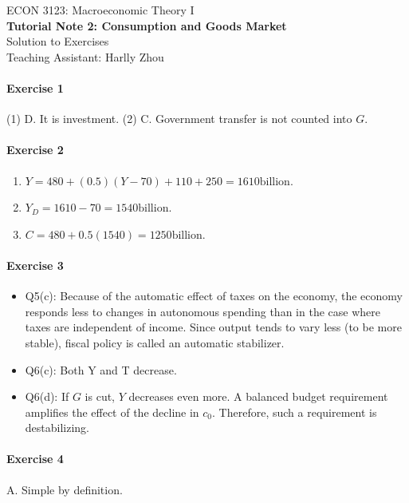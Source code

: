 \documentclass[12pt]{article}
\numberwithin{equation}{section}
\begin{document}
\begin{center}
    ECON 3123: Macroeconomic Theory I\\
    {\large \textbf{Tutorial Note 2: Consumption and Goods Market}}\\
    Solution to Exercises\\
    Teaching Assistant: Harlly Zhou
\end{center}

\paragraph{Exercise 1}
(1) D. It is investment. (2) C. Government transfer is not counted into $G$.

\paragraph{Exercise 2}
\begin{enumerate}[label=\alph*.]
    \item $Y=480+(0.5)(Y-70)+110+250=1610\text{billion}$.
    \item $Y_D = 1610 - 70 = 1540\text{billion}$.
    \item $C = 480 + 0.5(1540) = 1250 \text{billion}$.
\end{enumerate}

\paragraph{Exercise 3}
\begin{itemize}
    \item Q5(c): Because of the automatic effect of taxes on the economy, the economy responds less to changes in autonomous spending than in the case where taxes are independent of income. Since output tends to vary less (to be more stable), fiscal policy is called an automatic stabilizer.
    \item Q6(c): Both Y and T decrease.
    \item Q6(d): If $G$ is cut, $Y$ decreases even more. A balanced budget requirement amplifies the effect of the decline in $c_0$. Therefore, such a requirement is destabilizing.
\end{itemize}

\paragraph{Exercise 4}
A. Simple by definition.
\end{document}
